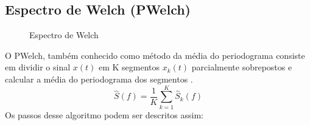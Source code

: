 \subsection{Espectro de Welch (PWelch)}
\begin{figure}[!htp]
	\begin{center}
		\caption{Espectro de Welch}
		\scalebox{.8}{
		
		}
		
		\label{fig:Welch}
	\end{center}	
\end{figure}
O \ac{PWelch}, tamb\'em conhecido como m\'etodo da m\'edia do periodograma consiste em dividir o sinal $x(t)$ em K segmentos $x_k(t)$ parcialmente sobrepostos e calcular a m\'edia do periodograma dos segmentos  \cite{PWelch}.
\begin{equation}
\hat{S}(f)= \frac{1}{K} \sum_{k=1}^{K} \hat{S}_k(f)
\end{equation}
Os passos desse algoritmo podem ser descritos assim:
\pagebreak
